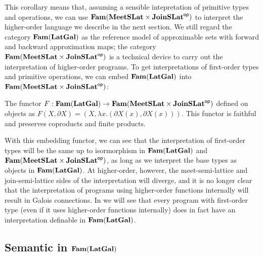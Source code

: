 This corollary means that, assuming a sensible intepretation of
primitive types and operations, we can use
$\mathbf{Fam}(\mathbf{MeetSLat} \times \mathbf{JoinSLat}^{\mathsf{op}})$ to interpret the higher-order
language we describe in the next section. We still regard the category
$\mathbf{Fam}(\mathbf{LatGal})$ as the reference model of approximable sets with
forward and backward approximation maps; the category
$\mathbf{Fam}(\mathbf{MeetSLat} \times \mathbf{JoinSLat}^{\mathsf{op}})$ is a technical device to carry
out the interpretation of higher-order programs. To get
interpretations of first-order types and primitive operations, we can
embed $\mathbf{Fam}(\mathbf{LatGal})$ into $\mathbf{Fam}(\mathbf{MeetSLat} \times \mathbf{JoinSLat}^{\mathsf{op}})$:

\begin{proposition}
  The functor
  $F : \mathbf{Fam}(\mathbf{LatGal}) \to \mathbf{Fam}(\mathbf{MeetSLat} \times \mathbf{JoinSLat}^{\mathsf{op}})$ defined
  on objects as
  $F(X, \partial X) = (X, \lambda x. (\partial X(x), \partial
  X(x)))$. This functor is faithful and preserves coproducts and
  finite products.
\end{proposition}

With this embedding functor, we can see that the interpretation of
first-order types will be the same up to isormorphism in
$\mathbf{Fam}(\mathbf{LatGal})$ and $\mathbf{Fam}(\mathbf{MeetSLat} \times \mathbf{JoinSLat}^{\mathsf{op}})$, as long as
we interpret the base types as objects in $\mathbf{Fam}(\mathbf{LatGal})$. At
higher-order, however, the meet-semi-lattice and join-semi-lattice
sides of the interpretation will diverge, and it is no longer clear
that the interpretation of programs using higher-order functions
internally will result in Galois connections. In 
we will see that every program with first-order type (even if it uses
higher-order functions internally) does in fact have an interpretation
definable in $\mathbf{Fam}(\mathbf{LatGal})$.



\subsection{Semantic \GPS in $\mathbf{Fam}(\mathbf{LatGal})$}
\label{sec:semantic-gps}

